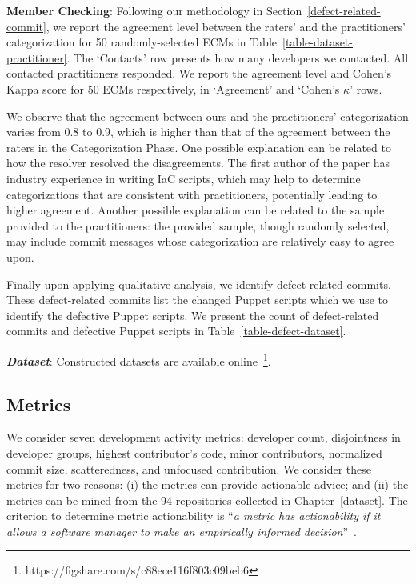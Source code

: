 \documentclass[smallextended]{svjour3}       %
\begin{document}
\textbf{Member Checking}: Following our methodology in Section~\ref{defect-related-commit}, we report the agreement level between the raters' and the practitioners' categorization for 50 randomly-selected ECMs in Table~\ref{table-dataset-practitioner}. The `Contacts' row presents how many developers we contacted. All contacted practitioners responded. We report the agreement level and Cohen's Kappa score for 50 ECMs respectively, in `Agreement' and `Cohen's $\kappa$' rows. 

We observe that the agreement between ours and the practitioners' categorization varies from 0.8 to 0.9, which is higher than that of the agreement between the raters in the Categorization Phase. One possible explanation can be related to how the resolver resolved the disagreements. The first author of the paper has industry experience in writing IaC scripts, which may help to determine categorizations that are consistent with practitioners, potentially leading to higher agreement. Another possible explanation can be related to the sample provided to the practitioners: the provided sample, though randomly selected, may include commit messages whose categorization are relatively easy to agree upon.  

Finally upon applying qualitative analysis, we identify defect-related commits. These defect-related commits list the changed Puppet scripts which we use to identify the defective Puppet scripts. We present the count of defect-related commits and defective Puppet scripts in Table~\ref{table-defect-dataset}.

\textbf{\textit{Dataset}}: Constructed datasets are available online~\footnote{https://figshare.com/s/c88ece116f803c09beb6}.


\subsection{Metrics}
\label{dataset-metrics} 

We consider seven development activity metrics: developer count, disjointness in developer groups, highest contributor's code, minor contributors, normalized commit size, scatteredness, and unfocused contribution. We consider these metrics for two reasons: (i) the metrics can provide actionable advice; and (ii) the metrics can be mined from the 94 repositories collected in Chapter~\ref{dataset}. The criterion to determine metric actionability is ``\textit{a metric has actionability if it allows a software manager to make an empirically informed decision}''~\citep{Meneely:Metrics:Tosem2013}. 
\end{document}
